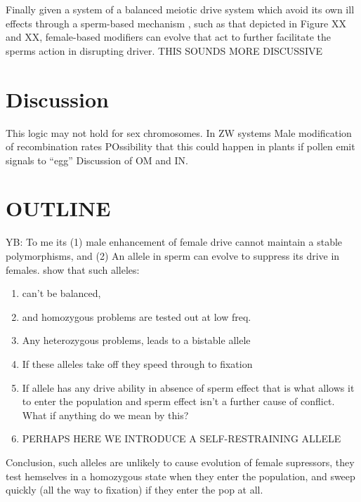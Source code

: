 \documentclass[12pt,letterpaper]{article}
\newcommand{\yb}[1]{{ \color{blue} #1}}
\begin{document}
Finally given a system of a balanced meiotic drive system which avoid
its own ill effects through a sperm-based mechanism
, such as that depicted in Figure XX and XX, female-based modifiers 
can evolve that act to further facilitate the sperms action in
disrupting driver. \yb{THIS SOUNDS MORE DISCUSSIVE}

\section*{Discussion}


This logic may not hold for sex chromosomes. In ZW systems 
 Male modification of recombination rates
POssibility that this could happen in plants if pollen emit signals to ``egg''
Discussion of OM and IN.


\section*{OUTLINE}
\yb{YB: To me its (1) male enhancement of female drive cannot maintain a stable polymorphisms, and (2) An allele in sperm can evolve to suppress its drive in females.}
show that such alleles:
\begin{enumerate}
\item can't be balanced, \\
\item and homozygous problems are tested out at low freq.  \\
\item Any heterozygous problems, leads to a bistable allele\\
\item If these alleles take off they speed through to fixation\\
\item If allele has any drive ability in absence of sperm effect that is what allows it to enter the population
and sperm effect isn't a further cause of conflict. What if anything do we mean by this?\\
\item PERHAPS HERE WE INTRODUCE A SELF-RESTRAINING ALLELE
\end{enumerate}

Conclusion, such alleles are unlikely to cause evolution of female supressors, they test hemselves in a homozygous
state when they enter the population, and sweep quickly (all the way to fixation) if they enter the pop at all.\\
\end{document}
